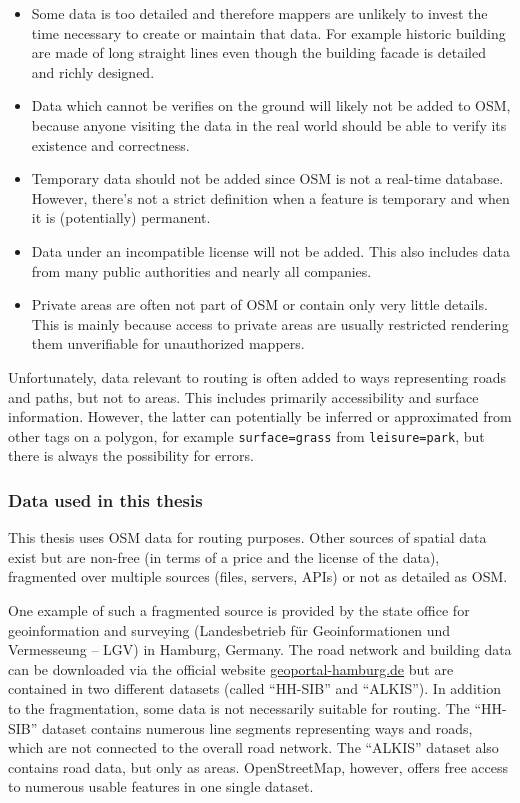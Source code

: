 			\begin{itemize}
				\item Some data is too detailed and therefore mappers are unlikely to invest the time necessary to create or maintain that data.
				For example historic building are made of long straight lines even though the building facade is detailed and richly designed.
				\item Data which cannot be verifies on the ground will likely not be added to OSM, because anyone visiting the data in the real world should be able to verify its existence and correctness.
				\item Temporary data should not be added since OSM is not a real-time database.
				However, there's not a strict definition when a feature is temporary and when it is (potentially) permanent.
				\item Data under an incompatible license will not be added.
				This also includes data from many public authorities and nearly all companies.
				\item Private areas are often not part of OSM or contain only very little details.
				This is mainly because access to private areas are usually restricted rendering them unverifiable for unauthorized mappers.
			\end{itemize}
			Unfortunately, data relevant to routing is often added to ways representing roads and paths, but not to areas.
			This includes primarily accessibility and surface information.
			However, the latter can potentially be inferred or approximated from other tags on a polygon, for example \texttt{surface=grass} from \texttt{leisure=park}, but there is always the possibility for errors.
			
		\subsubsection{Data used in this thesis}
		
			This thesis uses OSM data for routing purposes.
			Other sources of spatial data exist but are non-free (in terms of a price and the license of the data), fragmented over multiple sources (files, servers, APIs) or not as detailed as OSM.
			
			One example of such a fragmented source is provided by the state office for geoinformation and surveying (Landesbetrieb für Geoinformationen und Vermesseung -- LGV) in Hamburg, Germany.
			The road network and building data can be downloaded via the official website \href{https://geoportal-hamburg.de}{geoportal-hamburg.de} but are contained in two different datasets (called \enquote{HH-SIB} and \enquote{ALKIS}).
			In addition to the fragmentation, some data is not necessarily suitable for routing.
			The \enquote{HH-SIB} dataset contains numerous line segments representing ways and roads, which are not connected to the overall road network.
			The \enquote{ALKIS} dataset also contains road data, but only as areas.
			OpenStreetMap, however, offers free access to numerous usable features in one single dataset.
			

